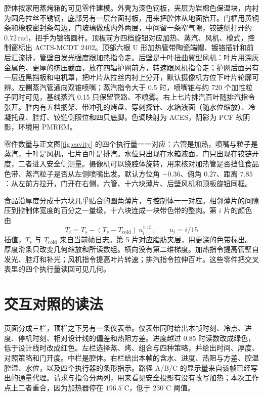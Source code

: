 腔体按家用蒸烤箱的可见零件建模。外壳为深色钢板，夹层为岩棉色保温块，内衬为圆角拉丝不锈钢，底部另有一层台面衬板，用来把腔体从地面抬开。门框用黄铜条和橡胶密封条勾边，门玻璃做成内外两层，中间留一条窄气隙，铰链侧打开约 \(0.72\,\mathrm{rad}\)，把手为镀铬圆杆。顶板前方四档旋钮对应加热、蒸汽、风机、模式，控制窗标出 ACTS-MCDT 2402。顶部六根 U 形加热管带陶瓷端帽、镀铬插针和前后汇流排，管壁自发光强度跟加热指令走。后壁是十叶扭曲翼型风机：叶片用深灰金属色、更厚的挤压截面，放在四辐护网前方，转速跟风机指令走；护网后面另有一层近黑挡板和电机罩，把叶片从拉丝内衬上分开，默认摄像机方位下叶片轮廓可辨。左侧蒸汽管通向双锥喷嘴；蒸汽指令大于 0.5 时，喷嘴锥与约 720 个加性粒子同时可见，基线蒸汽 0.15 只保留管路、不喷雾。右上七片排汽百叶随排汽指令张开。腔内有五档搁架、带冲孔的烤盘、穿刺探针、水箱液面（随水位缩放）、冷凝托盘、腔灯、铰链侧限位和四只底脚。色调映射为 ACES，阴影为 PCF 软阴影，环境用 PMREM。

零件数量与正文图\ref{fig:cavity} 的四个执行量一一对应：六管是加热，喷嘴与粒子是蒸汽，十叶是风机，七片百叶是排汽。水位只出现在水箱液面，门只出现在铰链开度，二者进入安全侧测量。摄像机可以绕腔体旋转，用来核对加热管是否挡住食品色带、蒸汽粒子是否从左侧喷嘴出发。默认方位角 \(-0.36\)、俯角 \(0.27\)、距离 \(7.85\)：从左前方拉开，门开在右侧，六管、十六块薄片、后壁风机和顶板旋钮同框。

食品沿厚度分成十六块几乎贴合的圆角薄片，与控制体一一对应。相邻薄片的间隙压到控制体宽度的百分之一量级，十六块连成一块带色带的整肉。第 \(i\) 片的颜色由
\[
T_i=T_s-(T_s-T_{\mathrm{cold}})\,u_i^{1.15},\qquad u_i=i/15
\]
插值，\(T_s\) 与 \(T_{\mathrm{cold}}\) 来自当前帧日志。第 5 片对应脂肪夹层，用更深的色带标出。厚度滑条只改变几何缩放和所读数组。横向没有第二维梯度。加热指令提高管壁自发光、腔灯和补光；风机指令提高叶片转速；排汽指令拉伸百叶。这些零件把交叉表里的四个执行量读回可见几何。

\section{交互对照的读法}

页面分成三栏，顶栏之下另有一条仪表带。仪表带同时给出本帧时刻、冷点、进度、停机时刻、相对设计线的偏差和热阻方差。进度越过 0.85 时读数改成绿色，低于设计线时改成红色。左栏选择蒸、烤、组合与四种策略，并给出时间、厚度、对照策略和门开度。中栏是腔体。右栏给出本帧的含水、进度、热阻与方差、腔温腔湿、水位，以及四个执行器的条形指示。路径 A/B/C 的显示量来自该帧已经写出的通量代理。请求与指令分两列，用来看见安全投影有没有改写加热；本次工作点上二者重合，因为加热器停在 \(196.5^\circ\mathrm{C}\)，低于 \(230^\circ\mathrm{C}\) 阈值。

